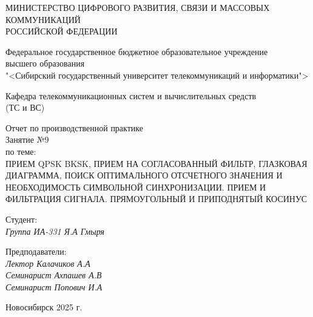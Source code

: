 \thispagestyle{empty}

\begin{center}
    МИНИСТЕРСТВО ЦИФРОВОГО РАЗВИТИЯ, СВЯЗИ И МАССОВЫХ КОММУНИКАЦИЙ \\ РОССИЙСКОЙ ФЕДЕРАЦИИ

    \vspace{20pt}

    Федеральное государственное бюджетное образовательное учреждение  \\  высшего образования \\
    "<Сибирский государственный университет телекоммуникаций и информатики"> \\

    \vspace{20pt}

    Кафедра телекоммуникационных систем и вычислительных средств \\  (ТС и ВС)
\end{center}

\vfill

\begin{center}
    Отчет по производственной практике \\  
    Занятие №9 \\

    \vspace{20pt}
    по теме: \\
    \uppercase{Прием QPSK BKSK, прием на согласованный фильтр, глазковая диаграмма, поиск оптимального отсчетного значения и 
    необходимость символьной синхронизации. Прием и фильтрация сигнала. Прямоугольный и приподнятый косинус}
\end{center}

\vfill

    \noindent Студент: \\
    \textit{Группа ИА-331 \hfill Я.А Гмыря}

    \vspace{20pt}

    \noindent Предподаватели: \\
    \textit{Лектор \hfill Калачиков А.А} \\
    \textit{Семинарист \hfill Ахпашев А.В} \\
    \textit{Семинарист \hfill Попович И.А}

\vfill

\begin{center}
    Новосибирск 2025 г.
\end{center}